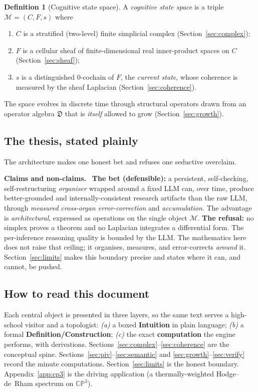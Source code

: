 \documentclass[11pt]{article}
\theoremstyle{definition}
\newtheorem{definition}{Definition}[section]
\theoremstyle{plain}
\theoremstyle{remark}
\newcommand{\Hon}{\noindent\textbf{\color{honestycol}Claims and non-claims.}\ }
\newcommand{\M}{\mathcal{M}}
\newcommand{\CC}{C}                 %
\newcommand{\Fs}{F}                 %
\newcommand{\Dop}{\mathfrak{D}}     %
\begin{document}
\begin{definition}[Cognitive state space]\label{def:M}
A \emph{cognitive state space} is a triple $\M=(\CC,\Fs,s)$ where
\begin{enumerate}[label=(\roman*),nosep]
  \item $\CC$ is a stratified (two-level) finite simplicial complex (Section~\ref{sec:complex});
  \item $\Fs$ is a cellular sheaf of finite-dimensional real inner-product spaces on $\CC$ (Section~\ref{sec:sheaf});
  \item $s$ is a distinguished $0$-cochain of $\Fs$, the \emph{current state}, whose
        coherence is measured by the sheaf Laplacian (Section~\ref{sec:coherence}).
\end{enumerate}
The space evolves in discrete time through structural operators drawn from an
operator algebra $\Dop$ that is \emph{itself} allowed to grow (Section~\ref{sec:growth}).
\end{definition}

\subsection{The thesis, stated plainly}

The architecture makes one honest bet and refuses one seductive overclaim.

\begin{hon}\Hon
\textbf{The bet (defensible):} a persistent, self-checking, self-restructuring
\emph{organiser} wrapped around a fixed LLM can, over time, produce better-grounded
and internally-consistent research artifacts than the raw LLM, through
\emph{measured cross-organ error-correction} and \emph{accumulation}. The advantage
is \emph{architectural}, expressed as operations on the single object $\M$.
\textbf{The refusal:} no simplex proves a theorem and no Laplacian integrates a
differential form. The per-inference reasoning quality is bounded by the LLM. The
mathematics here does not raise that ceiling; it organises, measures, and
error-corrects \emph{around} it. Section~\ref{sec:limits} makes this boundary precise
and states where it can, and cannot, be pushed.
\end{hon}

\subsection{How to read this document}

Each central object is presented in three layers, so the same text serves a
high-school visitor and a topologist:
\emph{(a)} a boxed \textbf{Intuition} in plain language;
\emph{(b)} a formal \textbf{Definition/Construction};
\emph{(c)} the exact \textbf{computation} the engine performs, with derivations.
Sections~\ref{sec:complex}--\ref{sec:coherence} are the conceptual spine.
Sections~\ref{sec:piv}--\ref{sec:semantic} and \ref{sec:growth}--\ref{sec:verify}
record the minute computations. Section~\ref{sec:limits} is the honest boundary.
Appendix~\ref{app:cp3} is the driving application (a thermally-weighted Hodge--de~Rham
spectrum on $\mathbb{CP}^3$).
\end{document}
